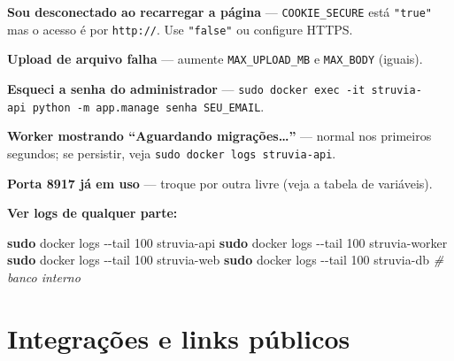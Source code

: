 \documentclass[
  10pt,
]{article}
\newenvironment{Shaded}{\begin{snugshade}}{\end{snugshade}}
\newcommand{\AttributeTok}[1]{\textcolor[rgb]{0.13,0.29,0.53}{#1}}
\newcommand{\CommentTok}[1]{\textcolor[rgb]{0.56,0.35,0.01}{\textit{#1}}}
\newcommand{\FunctionTok}[1]{\textcolor[rgb]{0.13,0.29,0.53}{\textbf{#1}}}
\newcommand{\NormalTok}[1]{#1}
\begin{document}
\textbf{Sou desconectado ao recarregar a página} ---
\texttt{COOKIE\_SECURE} está \texttt{"true"} mas o acesso é por
\texttt{http://}. Use \texttt{"false"} ou configure HTTPS.

\textbf{Upload de arquivo falha} --- aumente \texttt{MAX\_UPLOAD\_MB} e
\texttt{MAX\_BODY} (iguais).

\textbf{Esqueci a senha do administrador} ---
\texttt{sudo\ docker\ exec\ -it\ struvia-api\ python\ -m\ app.manage\ senha\ SEU\_EMAIL}.

\textbf{Worker mostrando ``Aguardando migrações\ldots{}''} --- normal
nos primeiros segundos; se persistir, veja
\texttt{sudo\ docker\ logs\ struvia-api}.

\textbf{Porta 8917 já em uso} --- troque por outra livre (veja a tabela
de variáveis).

\textbf{Ver logs de qualquer parte:}

\begin{Shaded}
\begin{Highlighting}[]
\FunctionTok{sudo}\NormalTok{ docker logs }\AttributeTok{{-}{-}tail}\NormalTok{ 100 struvia{-}api}
\FunctionTok{sudo}\NormalTok{ docker logs }\AttributeTok{{-}{-}tail}\NormalTok{ 100 struvia{-}worker}
\FunctionTok{sudo}\NormalTok{ docker logs }\AttributeTok{{-}{-}tail}\NormalTok{ 100 struvia{-}web}
\FunctionTok{sudo}\NormalTok{ docker logs }\AttributeTok{{-}{-}tail}\NormalTok{ 100 struvia{-}db      }\CommentTok{\# banco interno}
\end{Highlighting}
\end{Shaded}

\hypertarget{integrauxe7uxf5es-e-links-puxfablicos}{%
\section{Integrações e links
públicos}\label{integrauxe7uxf5es-e-links-puxfablicos}}
\end{document}
